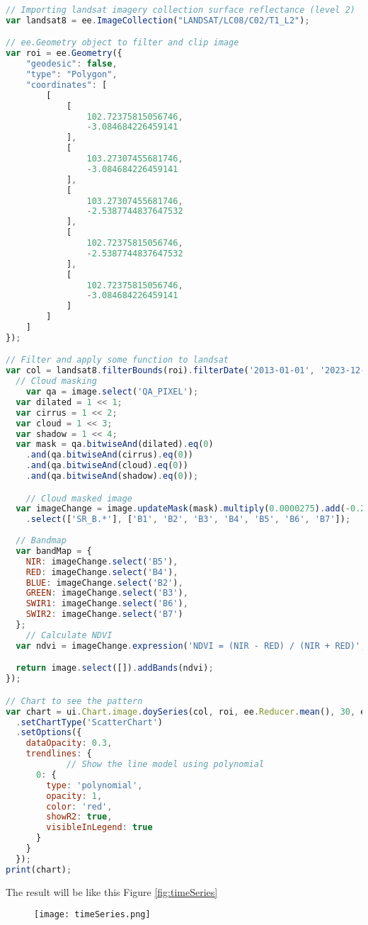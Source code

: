 \begin{lstlisting}[language=JavaScript, label={code:timeSeriesModelling}, caption={GEE Script for Time Series Modelling}]
// Importing landsat imagery collection surface reflectance (level 2)
var landsat8 = ee.ImageCollection("LANDSAT/LC08/C02/T1_L2");

// ee.Geometry object to filter and clip image
var roi = ee.Geometry({
	"geodesic": false,
	"type": "Polygon",
	"coordinates": [
		[
			[
				102.72375815056746,
				-3.084684226459141
			],
			[
				103.27307455681746,
				-3.084684226459141
			],
			[
				103.27307455681746,
				-2.5387744837647532
			],
			[
				102.72375815056746,
				-2.5387744837647532
			],
			[
				102.72375815056746,
				-3.084684226459141
			]
		]
	]
});

// Filter and apply some function to landsat
var col = landsat8.filterBounds(roi).filterDate('2013-01-01', '2023-12-31').map(function(image){
  // Cloud masking
	var qa = image.select('QA_PIXEL');
  var dilated = 1 << 1;
  var cirrus = 1 << 2;
  var cloud = 1 << 3;
  var shadow = 1 << 4;
  var mask = qa.bitwiseAnd(dilated).eq(0)
    .and(qa.bitwiseAnd(cirrus).eq(0))
    .and(qa.bitwiseAnd(cloud).eq(0))
    .and(qa.bitwiseAnd(shadow).eq(0));

	// Cloud masked image
  var imageChange = image.updateMask(mask).multiply(0.0000275).add(-0.2)
    .select(['SR_B.*'], ['B1', 'B2', 'B3', 'B4', 'B5', 'B6', 'B7']);
  
  // Bandmap
  var bandMap = {
    NIR: imageChange.select('B5'),
    RED: imageChange.select('B4'),
    BLUE: imageChange.select('B2'),
    GREEN: imageChange.select('B3'),
    SWIR1: imageChange.select('B6'),
    SWIR2: imageChange.select('B7')
  };
	// Calculate NDVI
  var ndvi = imageChange.expression('NDVI = (NIR - RED) / (NIR + RED)', bandMap);

  return image.select([]).addBands(ndvi);
});

// Chart to see the pattern
var chart = ui.Chart.image.doySeries(col, roi, ee.Reducer.mean(), 30, ee.Reducer.mean())
  .setChartType('ScatterChart')
  .setOptions({
    dataOpacity: 0.3,
    trendlines: {
			// Show the line model using polynomial
      0: {
        type: 'polynomial',
        opacity: 1,
        color: 'red',
        showR2: true,
        visibleInLegend: true
      }
    }
  });
print(chart);
\end{lstlisting}

The result will be like this Figure \ref{fig:timeSeries}
\begin{figure}[htbp]
	\label{fig:timeSeries}
	\centering
	\texttt{[image: timeSeries.png]}
	\label{Time series chart of NDVI in region of interest where the horizontal axis represent day in year and vertical axis represent the NDVI}
\end{figure}

